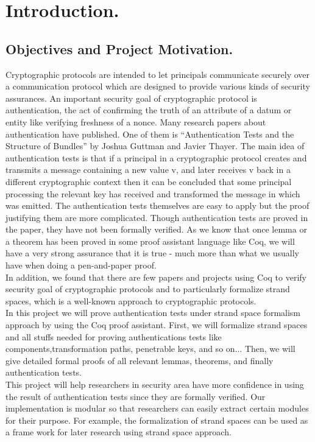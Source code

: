 \chapter{Introduction.}
\section{Objectives and Project Motivation.}
Cryptographic protocols are intended to let principals communicate securely over a communication protocol which are designed to provide various kinds of security assurances. An important security goal of cryptographic protocol is authentication, the act of confirming the truth of an attribute of a datum or entity like verifying freshness of a nonce. Many research papers about authentication have published. One of them is “Authentication Tests and the Structure of Bundles” by Joshua Guttman and Javier Thayer. The main idea of authentication tests is that if a principal in a cryptographic protocol creates and transmits a message containing a new value v, and later receives v back in a different cryptographic context then it can be concluded that some principal processing the relevant key has received and transformed the message in which  was emitted. The authentication tests themselves are easy to apply but the proof justifying them are more complicated. Though authentication tests are proved in the paper, they have not been formally verified.  As we know that once lemma or a theorem has been proved in some proof assistant language like Coq, we will have a very strong assurance that it is true - much more than what we usually have when doing a pen-and-paper proof.\\
In addition, we found that there are few papers and projects using Coq to verify security goal of cryptographic protocols and to particularly formalize strand spaces, which is a well-known approach to cryptographic protocols.\\
In this project we will prove authentication tests under strand space formalism approach by using the Coq proof assistant. First, we will formalize strand spaces and all stuffs needed for proving authentications tests like components,transformation paths, penetrable keys, and so on... Then, we will give detailed formal proofs of all relevant lemmas, theorems, and finally authentication tests.\\
This project will help researchers in security area have more confidence in using the result of authentication tests since they are formally verified. Our implementation is modular so that researchers can easily extract certain modules for their purpose. For example, the formalization of strand spaces can be used as a frame work for later research using strand space approach.  
